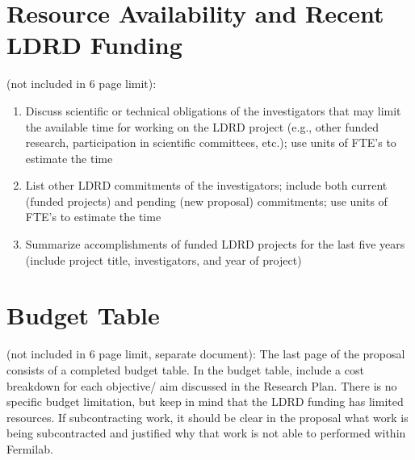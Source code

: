 \documentclass[11pt]{article}
\begin{document}
\section*{Resource Availability and Recent LDRD Funding} \tabto{0em}
(not included in 6 page limit):
\begin{enumerate}[label=\alph*]
\item Discuss scientific or technical obligations of the investigators that may limit the available time for working on the LDRD project (e.g., other funded research, participation in scientific committees, etc.); use units of FTE’s to estimate the time
\item List other LDRD commitments of the investigators; include both current (funded projects) and pending (new proposal) commitments; use units of FTE’s to estimate the time
\item Summarize accomplishments of funded LDRD projects for the last five years (include project title, investigators, and year of project)
\end{enumerate}

\section*{Budget Table} (not included in 6 page limit, separate document): The last page of the proposal consists of a completed budget table. In the budget table, include a cost breakdown for each objective/ aim discussed in the Research Plan. There is no specific budget limitation, but keep in mind that the LDRD funding has limited resources. If subcontracting work, it should be clear in the proposal what work is being subcontracted and justified why that work is not able to performed within Fermilab.
\end{document}
